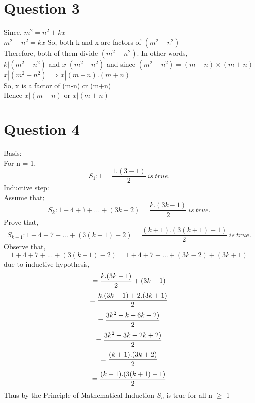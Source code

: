 \documentclass[12pt]{article}
\begin{document}
\section*{Question 3}
Since, $m^2 = n^2 + kx$\\
$m^2 - n^2 = kx$ So, both k and x are factors of $(m^2-n^2)$\\
Therefore, both of them divide $(m^2-n^2)$. In other words, \\
$k|(m^2-n^2)$ and $x|(m^2-n^2)$ and since $(m^2-n^2) = (m-n)\times(m+n)$\\
$x|(m^2-n^2) \implies x|(m-n).(m+n)$\\
So, x is a factor of (m-n) or (m+n) \\
Hence $x|(m-n)$ or $x|(m+n)$
\section*{Question 4}
Basis: \\
For n = 1,
$$
 S_1:  1 = \frac{1.(3-1)}{2} \ is\ true.
$$
Inductive step: \\
Assume that;
\[
    S_k: 1 + 4 + 7 + ... + (3k-2) = \frac{k.(3k-1)}{2} \ is\ true.
\]
Prove that,
\[
    S_{k+1}: 1 + 4 + 7 + ... + (3(k+1)-2) = \frac{(k+1).(3(k+1)-1)}{2} \ is\ true.
\]
Observe that,
$$
1 + 4 + 7 + ... + (3(k+1)-2) = 1 + 4 + 7 + ... + (3k-2) + (3k+1)
$$
due to inductive hypothesis,
$$
= \frac{k.(3k-1)}{2} + (3k + 1)\\
$$
$$
= \frac{k.(3k-1)+2.(3k+1)}{2}\\
$$
$$
= \frac{3k^2-k+6k+2)}{2} \\
$$
$$
= \frac{3k^2+3k+2k+2)}{2} \\
$$
$$
= \frac{(k+1).(3k+2)}{2} \\
$$
$$
= \frac{(k+1).(3(k+1)-1)}{2} \\
$$
Thus by the Principle of Mathematical Induction $S_n$ is true for all n $\geq$ 1
\end{document}

